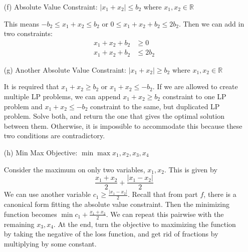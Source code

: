 \documentclass{article}
\begin{document}
\begin{itemize}
        \item [(f)] Absolute Value Constraint: $\lvert x_{1} + x_{2} \rvert \leq b_{2}$ where $x_{1}, x_{2} \in \mathbb{R}$
            \begin{answer}
                This means $-b_{2} \leq x_{1} + x_{2} \leq b_{2}$ or $0 \leq x_{1} + x_{2} + b_{2} \leq 2b_{2}$. Then we can add in two constraints:
                    \begin{align*}
                        x_{1} + x_{2} + b_{2} &\geq 0      \\
                        x_{1} + x_{2} + b_{2} &\leq 2b_{2}   
                    \end{align*}
            \end{answer}

        \item [(g)] Another Absolute Value Constraint: $\lvert x_{1} + x_{2} \rvert \geq b_{2}$ where $x_{1}, x_{2} \in \mathbb{R}$
            \begin{answer}
                It is required that $x_{1} + x_{2} \geq b_{2}$ or $x_{1} + x_{2} \leq -b_{2}$. If we are allowed to create multiple LP problems, we can append $x_{1} + x_{2} \geq b_{2}$ constraint to one LP problem and $x_{1} + x_{2} \leq -b_{2}$ constraint to the same, but duplicated LP problem. Solve both, and return the one that gives the optimal solution between them. Otherwise, it is impossible to accommodate this because these two conditions are contradictory.
            \end{answer}

        \item [(h)] Min Max Objective: $\min{\max{x_{1}, x_{2}, x_{3}, x_{4}}}$
            \begin{answer}
                Consider the maximum on only two variables, $x_{1}, x_{2}$. This is given by
                    \begin{equation*}
                        \dfrac{x_{1} + x_{2}}{2} + \dfrac{\lvert x_{1} - x_{2} \rvert}{2}
                    \end{equation*}
                We can use another variable $c_{1} \geq \frac{\lvert x_{1} - x_{2} \rvert}{2}$. Recall that from part $f$, there is a canonical form fitting the absolute value constraint. Then the minimizing function becomes $\min{c_{1} + \frac{x_{1} +  x_{2}}{2}}$. We can repeat this pairwise with the remaining $x_{3}, x_{4}$. At the end, turn the objective to maximizing the function by taking the negative of the loss function, and get rid of fractions by multiplying by some constant.
            \end{answer}
    \end{itemize}
\end{document}
